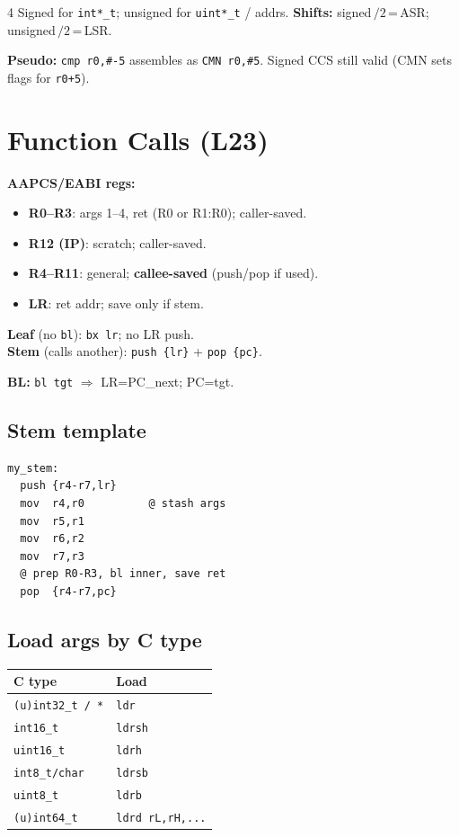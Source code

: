\documentclass[8pt,landscape]{extarticle}
\newcommand{\asm}[1]{\texttt{\scriptsize #1}}
\newcommand{\cee}[1]{\texttt{\scriptsize #1}}
\begin{document}
\begin{multicols*}{4}
Signed for \cee{int*\_t}; unsigned for \cee{uint*\_t} / addrs. \textbf{Shifts:} signed\,$/2$\,=\,ASR; unsigned\,$/2$\,=\,LSR.

\textbf{Pseudo:} \asm{cmp r0,\#-5} assembles as \asm{CMN r0,\#5}. Signed CCS still valid (CMN sets flags for \texttt{r0+5}).

\section{Function Calls (L23)}

\textbf{AAPCS/EABI regs:}
\begin{itemize}
\item \textbf{R0--R3}: args 1--4, ret (R0 or R1:R0); caller-saved.
\item \textbf{R12 (IP)}: scratch; caller-saved.
\item \textbf{R4--R11}: general; \textbf{callee-saved} (push/pop if used).
\item \textbf{LR}: ret addr; save only if stem.
\end{itemize}

\textbf{Leaf} (no \asm{bl}): \asm{bx lr}; no LR push.\\
\textbf{Stem} (calls another): \asm{push \{lr\}} + \asm{pop \{pc\}}.

\textbf{BL:} \asm{bl tgt} $\Rightarrow$ LR=PC\_next; PC=tgt.

\subsection{Stem template}
\begin{lstlisting}
my_stem:
  push {r4-r7,lr}
  mov  r4,r0          @ stash args
  mov  r5,r1
  mov  r6,r2
  mov  r7,r3
  @ prep R0-R3, bl inner, save ret
  pop  {r4-r7,pc}
\end{lstlisting}

\subsection{Load args by C type}
\begin{tabular}{@{}ll@{}}
\toprule
C type & Load \\
\midrule
\cee{(u)int32\_t / *} & \asm{ldr} \\
\cee{int16\_t}     & \asm{ldrsh} \\
\cee{uint16\_t}    & \asm{ldrh} \\
\cee{int8\_t/char} & \asm{ldrsb} \\
\cee{uint8\_t}     & \asm{ldrb} \\
\cee{(u)int64\_t}  & \asm{ldrd rL,rH,...} \\
\bottomrule
\end{tabular}


\end{multicols*}
\end{document}
